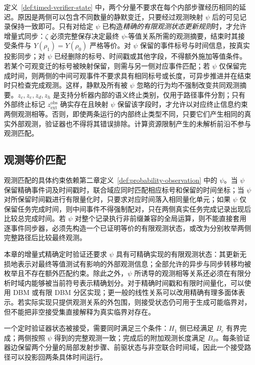 \documentclass[master,fontset=ubuntu]{shnuthesis}
\theoremstyle{definition}
\begin{document}
定义~\ref{def:timed-verifier-state} 中，两个分量不要求在每个内部步骤经历相同的延迟。原因是两侧可以包含不同数量的静默变迁，只要经过观测映射 \(\psi\) 后的可见记录保持一致即可。只有对给定 \(\psi\) 已构造\emph{精确的有限观测状态更新规则}时，才允许增量式同步：\(\zeta\) 必须完整保存决定最终 \(\psi\)-等值关系所需的观测摘要，结束时其接受条件与 \(Y(\rho_1)=Y(\rho_0)\) 严格等价。对 \(\psi\) 保留的事件标号与时间信息，按真实投影同步；对 \(\psi\) 已经删除的标号、时间戳或其他字段，不得额外施加等值条件。若某个可观变迁的标号被映射保留，则需与另一侧对应事件匹配；若 \(\psi\) 仅保留完成时间，则两侧的中间可观事件不要求具有相同标号或长度，可异步推进并在结束时只检查完成观测。这样，静默及所有被 \(\psi\) 忽略的行为均不强制改变共同观测摘要。$z_c,z_e,z_d,z_h$ 是支持分析器内部的语义终止类别，仅用于路径事件分割；只有外部终止标记 $z_{\mathrm{ext}}^{\mathrm{obs}}$ 确实存在且映射 $\psi$ 保留该字段时，才允许以对应终止信息约束两侧观测相等。否则，即使两条运行的内部终止类型不同，只要它们产生相同的真实外部观测，验证器也不得将其错误排除。计算资源限制产生的未解析前沿不参与观测匹配。

\subsection{观测等价匹配}

观测匹配的具体约束依赖第二章定义~\ref{def:probability-observation} 中的 \(\psi\)。当 \(\psi\) 保留精确事件词及时间戳时，联合域应同时匹配相应标号和保留的时间坐标；当 \(\psi\) 对所保留时间戳进行有限量化时，只要求对应时间落入相同量化单元；如果 \(\psi\) 仅保留任务完成时间，则中间事件不得强制配对，只在两侧真实任务完成记录出现后比较总完成时间。若 \(\psi\) 对整个记录执行非前缀兼容的全局运算，则不能直接套用逐事件同步器，必须先构造一个已证明等价的有限观测状态，或改为分别枚举两侧完整路径后比较最终观测。

本章的增量式精确定时验证还要求 \(\psi\) 具有可精确实现的有限观测状态：其更新无损地表示对最终等值测试有影响的外部观测信息；全部允许的异步与同步转移均被枚举且不存在额外匹配约束。除此之外，\(\psi\) 所诱导的观测相等关系还必须在有限分析时域内能够被当前符号表示精确划分。对于精确时间戳和有限时间量化，可以使用 DBM 或有限 DBM 分区实现；更一般的线性关系可以改用精确有理多面体表示。若实际实现只提供观测关系的外包围，则接受状态仍可用于生成可能临界对，但不能把非空接受集直接解释为真实临界对存在。

一个定时验证器状态被接受，需要同时满足三个条件：\(H_1\) 侧已经满足 \(B_c\) 有界完成；两侧按照 \(\psi\) 得到的完整观测一致；完成后的附加观测长度满足 \(B_d\)。每条验证器边保留两个分量的局部发射步骤、前驱状态与非空联合时间域，因此一个接受路径可以投影回两条具体时间运行。
\end{document}
